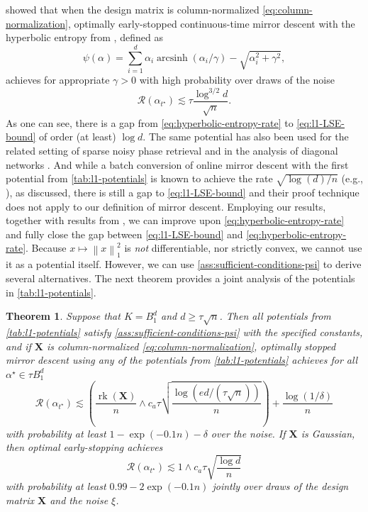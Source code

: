 \documentclass[a4paper]{article}
\newcommand{\pr}[1]{\left(#1\right)}
\newcommand{\norm}[1]{\left\|#1\right\|}
\newcommand{\X}[0]{\mathbf{X}}
\newcommand{\cR}[0]{\mathcal{R}}
\newcommand{\alphastar}{\alpha^\star}
\newcommand{\alphatstar}[0]{\alpha_{t^\star}}
\DeclareMathOperator{\rankOp}{rk}
\newcommand{\rank}[1]{\rankOp\pr{#1}}
\DeclareMathOperator{\arcsinh}{arcsinh}
\theoremstyle{thmstyle}
\newtheorem{theorem}{Theorem}
\theoremstyle{defstyle}
\theoremstyle{remark}
\begin{document}
\citet[Thm. 5]{Kanade2023earlystopped} showed that when the design matrix is column-normalized \eqref{eq:column-normalization}, optimally early-stopped continuous-time mirror descent with the hyperbolic entropy from \cite{Ghai2020}, defined as
\begin{equation*}
    \psi(\alpha)=\sum_{i=1}^d  \alpha_i\arcsinh\pr{\alpha_i/\gamma}-\sqrt{\alpha_i^2+\gamma^2},
\end{equation*}
achieves for appropriate $\gamma>0$ with high probability over draws of the noise
\begin{equation}
\label{eq:hyperbolic-entropy-rate}
     \cR(\alphatstar)\lesssim \tau\frac{\log^{3/2}d}{\sqrt{n}}.
\end{equation} 
As one can see, there is a gap from \eqref{eq:hyperbolic-entropy-rate} to \eqref{eq:l1-LSE-bound} of order (at least) $\log d$. The same potential has also been used for the related setting of sparse noisy phase retrieval \citep{Wu2022} and in the analysis of diagonal networks \cite{woodworth2020kernel}. 
And while a batch conversion of online mirror descent with the first potential from \cref{tab:l1-potentials} is known to achieve the rate $\sqrt{\log(d)/n}$ (e.g., \cite{bach2024learning}), as discussed, there is still a gap to \eqref{eq:l1-LSE-bound} and their proof technique does not apply to our definition of mirror descent.
Employing our results, together with results from \cite{Bellec2017localizedgaussianwidthmconvex}, we can improve upon \eqref{eq:hyperbolic-entropy-rate} and fully close the gap between \eqref{eq:l1-LSE-bound} and \eqref{eq:hyperbolic-entropy-rate}. Because $x\mapsto\norm{x}_1^2$ is \emph{not} differentiable, nor strictly convex, we cannot use it as a potential itself. However, we can use \cref{ass:sufficient-conditions-psi} to derive several alternatives. The next theorem provides a joint analysis of the potentials in \cref{tab:l1-potentials}.
\begin{theorem}
\label{thm:l1-all-combined}
    Suppose that $K=B_1^d$ and $d\geq \tau \sqrt{n}$. Then all potentials from \cref{tab:l1-potentials} satisfy \cref{ass:sufficient-conditions-psi} with the specified constants, and if $\X$ is column-normalized \eqref{eq:column-normalization}, optimally stopped mirror descent using any of the potentials from \cref{tab:l1-potentials} achieves for all $\alphastar\in \tau B_1^d$
    \begin{equation*}
        \cR(\alphatstar)\lesssim \pr{\frac{\rank{\X}}{n} \wedge c_a\tau\sqrt{\frac{\log (ed/(\tau\sqrt{n}))}{n}}} +\frac{\log(1/\delta)}{n}
    \end{equation*}
    with probability at least $1-\exp(-0.1n)-\delta$ over the noise. 
    If $\X$ is Gaussian, then optimal early-stopping achieves
    \begin{equation*}
        \cR(\alphatstar) \lesssim 1\wedge c_a\tau \sqrt{\frac{\log d}{n}}
    \end{equation*}
    with probability at least $0.99-2\exp\pr{-0.1n}$ jointly over draws of the design matrix $\X$ and the noise $\xi$.
\end{theorem}
\end{document}
